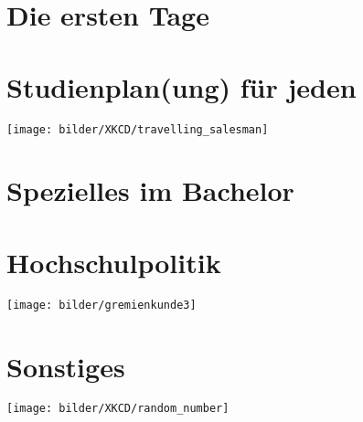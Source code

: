 \documentclass[]{papertex}
\begin{document}
	\thispagestyle{empty}
	\clearpage

	\setcounter{page}{1}
	\tableofcontents
	
	\newpage

	\section{Die ersten Tage}
		
		
	\newpage

	\section{Studienplan(ung) für jeden}
		\label{studienplan}
		\begin{multicols}{2}
		
		\end{multicols}
		\vfill
		\begin{center}
		\texttt{[image: bilder/XKCD/travelling\_salesman]}
	      \end{center}
	      \vfill
	\newpage

	\section{Spezielles im Bachelor}
		\label{bachelor}
		
		
		
	
	\newpage

	\section{Hochschulpolitik}
		\label{politik}
		\begin{minipage}[H]{1.0\linewidth}
		\begin{center}
			\centering
			\texttt{[image: bilder/gremienkunde3]}
		\end{center}
		\end{minipage}
		\begin{multicols}{2}
		
		
		\end{multicols}
	\newpage

	\section{Sonstiges}
		\label{sonstiges} 
		\begin{center}
		\texttt{[image: bilder/XKCD/random\_number]}
		\end{center}
		\begin{multicols}{2}
		
		
		\end{multicols}
		\newpage
		
		\newpage
		
\end{document}
